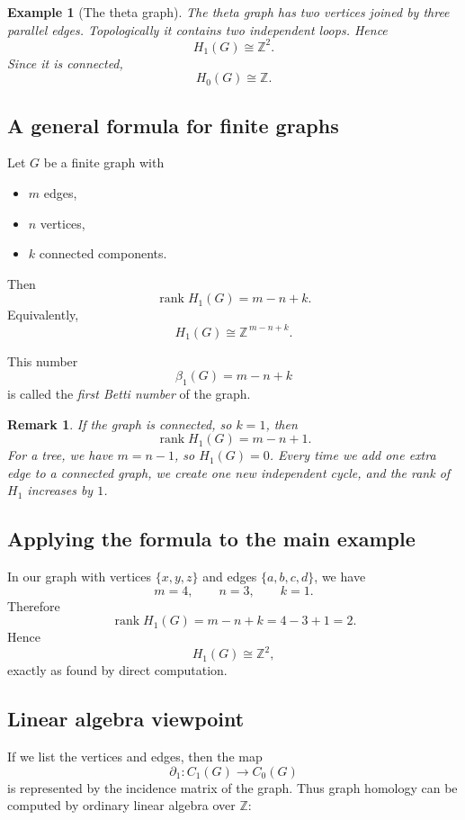 \documentclass[12pt,a4paper]{article}
\newtheorem{example}[definition]{Example}
\theoremstyle{notespace}
\newtheorem{remark}{Remark}[section]
\begin{document}
	\begin{example}[The theta graph]
		The theta graph has two vertices joined by three parallel edges. Topologically it contains two independent loops. Hence
		\[
		H_1(G)\cong \mathbb{Z}^2.
		\]
		Since it is connected,
		\[
		H_0(G)\cong \mathbb{Z}.
		\]
	\end{example}
	
	\subsection{A general formula for finite graphs}
	
	Let \(G\) be a finite graph with
	\begin{itemize}[leftmargin=2em]
		\item \(m\) edges,
		\item \(n\) vertices,
		\item \(k\) connected components.
	\end{itemize}
	
	Then
	\[
	\operatorname{rank} H_1(G)=m-n+k.
	\]
	Equivalently,
	\[
	H_1(G)\cong \mathbb{Z}^{\,m-n+k}.
	\]
	
	This number
	\[
	\beta_1(G)=m-n+k
	\]
	is called the \emph{first Betti number} of the graph.
	
	\begin{remark}
		If the graph is connected, so \(k=1\), then
		\[
		\operatorname{rank} H_1(G)=m-n+1.
		\]
		For a tree, we have \(m=n-1\), so \(H_1(G)=0\). Every time we add one extra edge to a connected graph, we create one new independent cycle, and the rank of \(H_1\) increases by \(1\).
	\end{remark}
	
	\subsection{Applying the formula to the main example}
	
	In our graph with vertices \(\{x,y,z\}\) and edges \(\{a,b,c,d\}\), we have
	\[
	m=4,\qquad n=3,\qquad k=1.
	\]
	Therefore
	\[
	\operatorname{rank} H_1(G)=m-n+k=4-3+1=2.
	\]
	Hence
	\[
	H_1(G)\cong \mathbb{Z}^2,
	\]
	exactly as found by direct computation.
	
	\subsection{Linear algebra viewpoint}
	
	If we list the vertices and edges, then the map
	\[
	\partial_1:C_1(G)\to C_0(G)
	\]
	is represented by the incidence matrix of the graph. Thus graph homology can be computed by ordinary linear algebra over \(\mathbb{Z}\):
	
\end{document}
